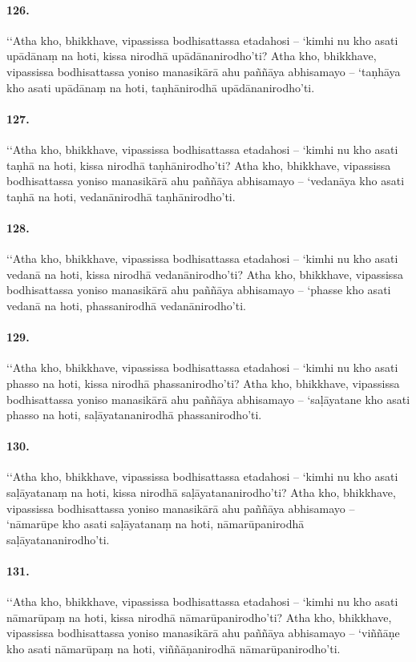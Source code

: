 \paragraph{126.} ‘‘Atha kho, bhikkhave, vipassissa bodhisattassa etadahosi – ‘kimhi nu kho asati upādānaṃ na hoti, kissa nirodhā upādānanirodho’ti? Atha kho, bhikkhave, vipassissa bodhisattassa yoniso manasikārā ahu paññāya abhisamayo – ‘taṇhāya kho asati upādānaṃ na hoti, taṇhānirodhā upādānanirodho’ti.

\paragraph{127.} ‘‘Atha kho, bhikkhave, vipassissa bodhisattassa etadahosi – ‘kimhi nu kho asati taṇhā na hoti, kissa nirodhā taṇhānirodho’ti? Atha kho, bhikkhave, vipassissa bodhisattassa yoniso manasikārā ahu paññāya abhisamayo – ‘vedanāya kho asati taṇhā na hoti, vedanānirodhā taṇhānirodho’ti.

\paragraph{128.} ‘‘Atha kho, bhikkhave, vipassissa bodhisattassa etadahosi – ‘kimhi nu kho asati vedanā na hoti, kissa nirodhā vedanānirodho’ti? Atha kho, bhikkhave, vipassissa bodhisattassa yoniso manasikārā ahu paññāya abhisamayo – ‘phasse kho asati vedanā na hoti, phassanirodhā vedanānirodho’ti.

\paragraph{129.} ‘‘Atha kho, bhikkhave, vipassissa bodhisattassa etadahosi – ‘kimhi nu kho asati phasso na hoti, kissa nirodhā phassanirodho’ti? Atha kho, bhikkhave, vipassissa bodhisattassa yoniso manasikārā ahu paññāya abhisamayo – ‘saḷāyatane kho asati phasso na hoti, saḷāyatananirodhā phassanirodho’ti.

\paragraph{130.} ‘‘Atha kho, bhikkhave, vipassissa bodhisattassa etadahosi – ‘kimhi nu kho asati saḷāyatanaṃ na hoti, kissa nirodhā saḷāyatananirodho’ti? Atha kho, bhikkhave, vipassissa bodhisattassa yoniso manasikārā ahu paññāya abhisamayo – ‘nāmarūpe kho asati saḷāyatanaṃ na hoti, nāmarūpanirodhā saḷāyatananirodho’ti.

\paragraph{131.} ‘‘Atha kho, bhikkhave, vipassissa bodhisattassa etadahosi – ‘kimhi nu kho asati nāmarūpaṃ na hoti, kissa nirodhā nāmarūpanirodho’ti? Atha kho, bhikkhave, vipassissa bodhisattassa yoniso manasikārā ahu paññāya abhisamayo – ‘viññāṇe kho asati nāmarūpaṃ na hoti, viññāṇanirodhā nāmarūpanirodho’ti.

